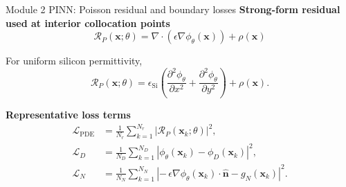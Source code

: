 \documentclass[aspectratio=169,10pt]{beamer}
\begin{document}
\begin{frame}{Module 2 PINN: Poisson residual and boundary losses}
\footnotesize
\textbf{Strong-form residual used at interior collocation points}
\vspace{-0.25em}
\begin{equation*}
\boxed{
\mathcal R_P(\mathbf x;\theta)
=
\nabla\cdot\left(\epsilon\nabla \phi_{\theta}(\mathbf x)\right)+\rho(\mathbf x)
}
\end{equation*}

\vspace{-0.25em}
For uniform silicon permittivity,
\vspace{-0.15em}
\begin{equation*}
\mathcal R_P(\mathbf x;\theta)
=
\epsilon_{\mathrm{Si}}\left(
\frac{\partial^2\phi_{\theta}}{\partial x^2}
+
\frac{\partial^2\phi_{\theta}}{\partial y^2}
\right)+\rho(\mathbf x).
\end{equation*}

\vspace{-0.3em}
\textbf{Representative loss terms}
\vspace{-0.25em}
\begin{align*}
\mathcal L_{\mathrm{PDE}}&=\frac{1}{N_r}\sum_{k=1}^{N_r}\left|\mathcal R_P(\mathbf x_k;\theta)\right|^2,\\[-0.15em]
\mathcal L_D&=\frac{1}{N_D}\sum_{k=1}^{N_D}\left|\phi_{\theta}(\mathbf x_k)-\phi_D(\mathbf x_k)\right|^2,\\[-0.15em]
\mathcal L_N&=\frac{1}{N_N}\sum_{k=1}^{N_N}\left|-\,\epsilon\nabla\phi_{\theta}(\mathbf x_k)\cdot\hat{\mathbf n}-g_N(\mathbf x_k)\right|^2.
\end{align*}
\end{frame}
\end{document}
